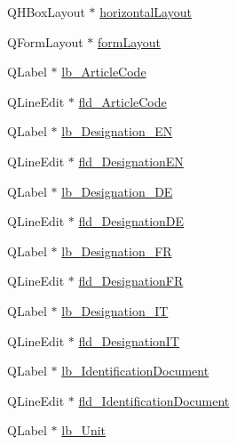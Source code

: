 \begin{DoxyCompactItemize}
\item 
Q\-H\-Box\-Layout $\ast$ \hyperlink{class_ui__mdt_cl_article_editor_ae870dcfff37aa5248b78f9a27eb3276c}{horizontal\-Layout}
\item 
Q\-Form\-Layout $\ast$ \hyperlink{class_ui__mdt_cl_article_editor_a5dbe124cf0740e1de3a8cca96a810433}{form\-Layout}
\item 
Q\-Label $\ast$ \hyperlink{class_ui__mdt_cl_article_editor_ad15cc17ca97f99ceee28014df93d9351}{lb\-\_\-\-Article\-Code}
\item 
Q\-Line\-Edit $\ast$ \hyperlink{class_ui__mdt_cl_article_editor_a1b8cbd2a6c1bc5746812b3d7376edb81}{fld\-\_\-\-Article\-Code}
\item 
Q\-Label $\ast$ \hyperlink{class_ui__mdt_cl_article_editor_a51e4014d2917fd83c31b92e2b66298aa}{lb\-\_\-\-Designation\-\_\-\-E\-N}
\item 
Q\-Line\-Edit $\ast$ \hyperlink{class_ui__mdt_cl_article_editor_aa15ec8a5f140febdf7623bb206886875}{fld\-\_\-\-Designation\-E\-N}
\item 
Q\-Label $\ast$ \hyperlink{class_ui__mdt_cl_article_editor_a15ba92a35d2377a4e03ac6de7fcb79b9}{lb\-\_\-\-Designation\-\_\-\-D\-E}
\item 
Q\-Line\-Edit $\ast$ \hyperlink{class_ui__mdt_cl_article_editor_acaa0b546f773c3d6b03d5289614055fb}{fld\-\_\-\-Designation\-D\-E}
\item 
Q\-Label $\ast$ \hyperlink{class_ui__mdt_cl_article_editor_a67b7ae250e0391f57e8903e403e03348}{lb\-\_\-\-Designation\-\_\-\-F\-R}
\item 
Q\-Line\-Edit $\ast$ \hyperlink{class_ui__mdt_cl_article_editor_ab058ffab8e6cac94de4c7fb25ae5af65}{fld\-\_\-\-Designation\-F\-R}
\item 
Q\-Label $\ast$ \hyperlink{class_ui__mdt_cl_article_editor_a2da779d6e0a55029dd48cdc2a1007cff}{lb\-\_\-\-Designation\-\_\-\-I\-T}
\item 
Q\-Line\-Edit $\ast$ \hyperlink{class_ui__mdt_cl_article_editor_a8b17c4f4e406af6d499f98be60431802}{fld\-\_\-\-Designation\-I\-T}
\item 
Q\-Label $\ast$ \hyperlink{class_ui__mdt_cl_article_editor_a994df9029ebf28e0df212fb399da9e5a}{lb\-\_\-\-Identification\-Document}
\item 
Q\-Line\-Edit $\ast$ \hyperlink{class_ui__mdt_cl_article_editor_a8e28dd55d25f1e2b0fa14985b36884ce}{fld\-\_\-\-Identification\-Document}
\item 
Q\-Label $\ast$ \hyperlink{class_ui__mdt_cl_article_editor_ac09bacf3ec4c03261af24576bbd66383}{lb\-\_\-\-Unit}

\end{DoxyCompactItemize}

